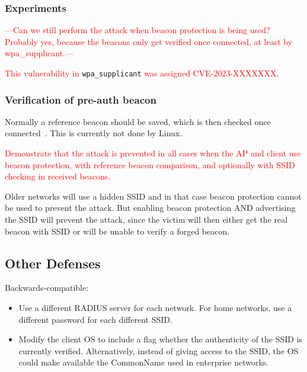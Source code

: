 \documentclass[sigconf,review,anonymous]{acmart}
\DeclareRobustCommand{\red}[1]{\textcolor{red}{#1}}
\begin{document}
\subsubsection{Experiments}

\red{---Can we still perform the attack when beacon protection is being used? Probably yes, because the beacons only get verified once connected, at least by wpa\_supplicant.---}

\red{This vulnerability in} \verb|wpa_supplicant| \red{was assigned CVE-2023-XXXXXXX}.

\subsubsection{Verification of pre-auth beacon}

Normally a reference beacon should be saved, which is then checked once connected~\cite{vanhoef-wisec2020}.
This is currently not done by Linux.

\red{Demonstrate that the attack is prevented in all cases when the AP and client use beacon protection, with reference beacon comparison, and optionally with SSID checking in received beacons.}

Older networks will use a hidden SSID and in that case beacon protection cannot be used to prevent the attack.
But enabling beacon protection AND advertising the SSID will prevent the attack, since the victim will then either get the real beacon with SSID or will be unable to verify a forged beacon.

\subsection{Other Defenses}

Backwards-compatible:
\begin{itemize}
	\item Use a different RADIUS server for each network.
	For home networks, use a different password for each different SSID.
	\item Modify the client OS to include a flag whether the authenticity of the SSID is currently verified.
	Alternatively, instead of giving access to the SSID, the OS could make available the CommonName used in enterprise networks.
\end{itemize}
\end{document}

